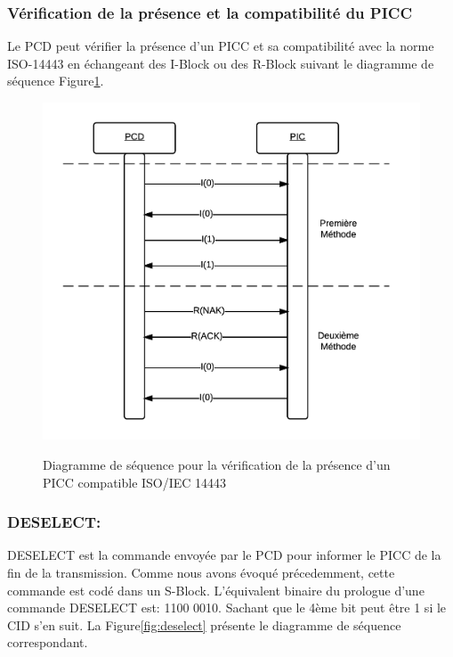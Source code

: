 \documentclass{themeensg}
\begin{document}
\subsubsection{Vérification de la présence et la compatibilité du PICC}
Le PCD peut vérifier la présence d'un PICC et sa compatibilité avec la norme ISO-14443 en échangeant des I-Block ou des R-Block suivant le diagramme de séquence Figure\ref{fig:presencecheck}.

\begin{figure}[h!]
\centering
\includegraphics[scale=0.9]{images/presencecheck.png}
\label{fig:presencecheck}
\caption{Diagramme de séquence pour la vérification de la présence d'un PICC compatible ISO/IEC 14443}
\end{figure}

\subsubsection{DESELECT:}
DESELECT est la commande envoyée par le PCD pour informer le PICC de la fin de la transmission. Comme nous avons évoqué précedemment, cette commande est codé dans un S-Block. L'équivalent binaire du prologue d'une commande DESELECT est: 1100 0010. Sachant que le 4ème bit peut être 1 si le CID s'en suit. La Figure\ref{fig:deselect} présente le diagramme de séquence correspondant.
\end{document}
